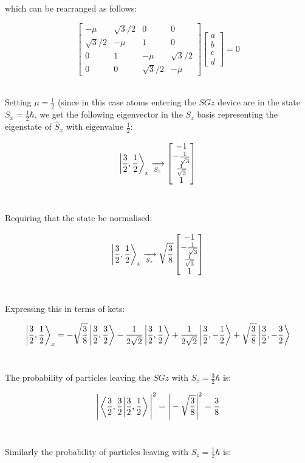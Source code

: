 \documentclass[9pt]{extarticle}
\begin{document}
\begin{multicols*}{2}
which can be rearranged as follows:

$$
\begin{bmatrix}
        -\mu & \sqrt 3 /2& 0 & 0 \\
        \sqrt 3 /2& -\mu & 1 & 0 \\
        0 & 1 &-\mu & \sqrt 3 /2\\
        0 & 0 & \sqrt 3 /2& -\mu
\end{bmatrix}
\begin{bmatrix}
        a \\ b \\ c \\ d
\end{bmatrix}
=0
$$ \ 

Setting $\mu = \frac 12$ (since in this case atoms entering the $SGz$ device are in the state $S_x = \frac 12 \hbar$, we get the following eigenvector in the $S_z$ basis representing the eigenstate of $\hat S_x$ with eigenvalue $\frac 12$:

$$\ket{\frac 32, \frac 12}_x \xrightarrow[S_z]{} 
\begin{bmatrix}
	-1 \\ 
	-\frac{1}{\sqrt 3} \\ 
	\frac{1}{\sqrt 3} \\ 
	1
\end{bmatrix}
$$ \ 

Requiring that the state be normalised:

$$
\ket{\frac 32, \frac 12}_x \xrightarrow[S_z]{} \sqrt{\frac 38}
\begin{bmatrix}
        -1 \\
        -\frac{1}{\sqrt 3} \\
        \frac{1}{\sqrt 3} \\
        1
\end{bmatrix}
$$ \ 

Expressing this in terms of kets:

$$\ket{\frac 32, \frac 12}_x = -\sqrt{\frac 38} \ket{\frac 32, \frac 32} - \frac{1}{2\sqrt 2} \ket{\frac 32, \frac 12} + \frac{1}{2\sqrt 2} \ket{\frac 32, -\frac 12} + \sqrt{\frac 38} \ket{\frac 32, -\frac 32}$$ \ 

The probability of particles leaving the $SGz$ with $S_z = \frac 32 \hbar$ is:

$$\Bigg| \bra{\frac 32, \frac 32}\ket{\frac 32, \frac 12} \Bigg|^2 = \Bigg| -\sqrt{\frac 38} \Bigg|^2 = \frac 38$$ \ 

Similarly the probability of particles leaving with $S_z = \frac 12 \hbar$ is:


\end{multicols*}
\end{document}
